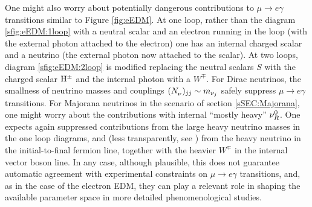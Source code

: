 \documentclass[12pt,a4paper]{article}
\begin{document}
One might also worry about potentially dangerous contributions to $\mu\to e\gamma$ transitions similar to Figure \ref{fig:eEDM}. At one loop, rather than the diagram \ref{sfig:eEDM:1loop} with a neutral scalar and an electron running in the loop (with the external photon attached to the electron) one has an internal charged scalar and a neutrino (the external photon now attached to the scalar). At two loops, diagram \ref{sfig:eEDM:2loop} is modified replacing the neutral scalars $S$ with the charged scalar ${\rm H}^\pm$ and the internal photon with a $W^\mp$. For Dirac neutrinos, the smallness of neutrino masses and couplings $(\mNN)_{jj}\sim m_{\nu_j}$ safely suppress $\mu\to e\gamma$ transitions. For Majorana neutrinos in the scenario of section \ref{sSEC:Majorana}, one might worry about the contributions with internal ``mostly heavy'' $\nu_R^0$. One expects again suppressed contributions from the large heavy neutrino masses in the one loop diagrams, and (less transparently, see \cite{Ilisie:2015tra}) from the heavy neutrino in the initial-to-final fermion line, together with the heavier $W^\mp$ in the internal vector boson line. In any case, although plausible, this does not guarantee automatic agreement with experimental constraints on $\mu\to e\gamma$ transitions, and, as in the case of the electron EDM, they can play a relevant role in shaping the available parameter space in more detailed phenomenological studies.

\end{document}

